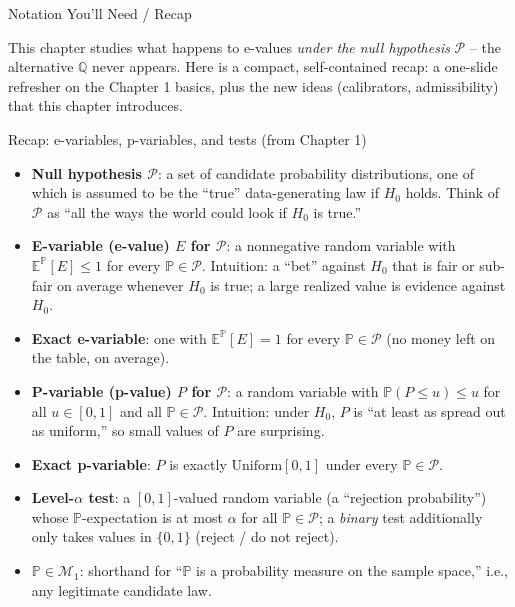 \documentclass[aspectratio=169,10pt]{beamer}
\newcommand{\PP}{\mathbb{P}}
\newcommand{\QQ}{\mathbb{Q}}
\newcommand{\EE}{\mathbb{E}}
\newcommand{\calP}{\mathcal{P}}
\begin{document}
\begin{frame}[allowframebreaks]{Notation You'll Need / Recap}

This chapter studies what happens to e-values \emph{under the null hypothesis}
$\calP$ -- the alternative $\QQ$ never appears. Here is a compact,
self-contained recap: a one-slide refresher on the Chapter 1 basics, plus the
new ideas (calibrators, admissibility) that this chapter introduces.

  \begin{block}{Recap: e-variables, p-variables, and tests (from Chapter 1)}
    \begin{itemize}
      \item \textbf{Null hypothesis $\calP$}: a set of candidate probability
        distributions, one of which is assumed to be the ``true'' data-generating
        law if $H_0$ holds. Think of $\calP$ as ``all the ways the world could
        look if $H_0$ is true.''
      \item \textbf{E-variable (e-value) $E$ for $\calP$}: a nonnegative random
        variable with $\EE^\PP[E] \le 1$ for every $\PP \in \calP$. Intuition:
        a ``bet'' against $H_0$ that is fair or sub-fair on average whenever
        $H_0$ is true; a large realized value is evidence against $H_0$.
      \item \textbf{Exact e-variable}: one with $\EE^\PP[E] = 1$ for every
        $\PP \in \calP$ (no money left on the table, on average).
      \item \textbf{P-variable (p-value) $P$ for $\calP$}: a random variable
        with $\PP(P \le u) \le u$ for all $u \in [0,1]$ and all $\PP \in \calP$.
        Intuition: under $H_0$, $P$ is ``at least as spread out as uniform,''
        so small values of $P$ are surprising.
      \item \textbf{Exact p-variable}: $P$ is exactly $\mathrm{Uniform}[0,1]$
        under every $\PP \in \calP$.
      \item \textbf{Level-$\alpha$ test}: a $[0,1]$-valued random variable
        (a ``rejection probability'') whose $\PP$-expectation is at most
        $\alpha$ for all $\PP \in \calP$; a \emph{binary} test additionally only
        takes values in $\{0,1\}$ (reject / do not reject).
      \item $\PP \in \mathcal{M}_1$: shorthand for ``$\PP$ is a probability
        measure on the sample space,'' i.e., any legitimate candidate law.
    \end{itemize}
  \end{block}


\end{frame}
\end{document}
